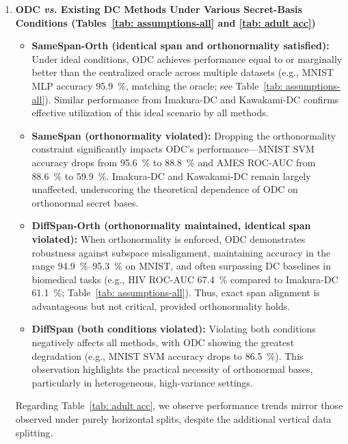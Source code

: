 \documentclass[final,3p,times]{elsarticle}
\theoremstyle{plain}
\begin{document}
\begin{enumerate}[label=\textbf{\Roman*.}, leftmargin=*]

\item \textbf{ODC \emph{vs.} Existing DC Methods Under Various Secret-Basis Conditions (Tables~\ref{tab: assumptions-all} and \ref{tab: adult acc})}

\begin{itemize}[leftmargin=*, itemsep=3pt]

    \item \textbf{SameSpan-Orth (identical span and orthonormality satisfied):} 
    Under ideal conditions, ODC achieves performance equal to or marginally better than the centralized oracle across multiple datasets (e.g., MNIST MLP accuracy \SI{95.9}{\%}, matching the oracle; see Table~\ref{tab: assumptions-all}). Similar performance from Imakura-DC and Kawakami-DC confirms effective utilization of this ideal scenario by all methods.

    \item \textbf{SameSpan (orthonormality violated):} 
    Dropping the orthonormality constraint significantly impacts ODC's performance—MNIST SVM accuracy drops from \SI{95.6}{\%} to \SI{88.8}{\%} and AMES ROC-AUC from \SI{88.6}{\%} to \SI{59.9}{\%}. Imakura-DC and Kawakami-DC remain largely unaffected, underscoring the theoretical dependence of ODC on orthonormal secret bases.

    \item \textbf{DiffSpan-Orth (orthonormality maintained, identical span violated):} 
    When orthonormality is enforced, ODC demonstrates robustness against subspace misalignment, maintaining accuracy in the range \SI{94.9}{\%}--\SI{95.3}{\%} on MNIST, and often surpassing DC baselines in biomedical tasks (e.g., HIV ROC-AUC \SI{67.4}{\%} compared to Imakura-DC \SI{61.1}{\%}; Table~\ref{tab: assumptions-all}). Thus, exact span alignment is advantageous but not critical, provided orthonormality holds.

    \item \textbf{DiffSpan (both conditions violated):} 
    Violating both conditions negatively affects all methods, with ODC showing the greatest degradation (e.g., MNIST SVM accuracy drops to \SI{86.5}{\%}). This observation highlights the practical necessity of orthonormal bases, particularly in heterogeneous, high-variance settings.

\end{itemize}

Regarding Table~\ref{tab: adult acc}, we observe performance trends mirror those observed under purely horizontal splits, despite the additional vertical data splitting.


\end{enumerate}
\end{document}
